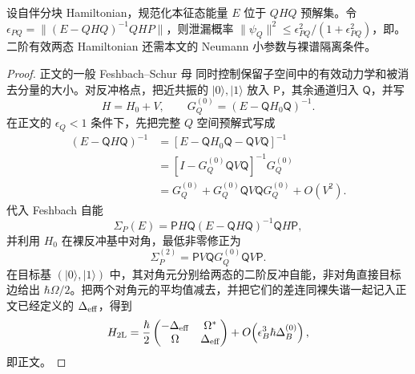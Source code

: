\begin{proposition}
设自伴分块 Hamiltonian，规范化本征态能量 $E$ 位于 $QHQ$ 预解集。令 $\epsilon_{PQ}=\|(E-QHQ)^{-1}QHP\|$，则泄漏概率 $\|\psi_Q\|^2\le\epsilon_{PQ}^2/(1+\epsilon_{PQ}^2)$，即。二阶有效两态 Hamiltonian 还需本文的 Neumann 小参数与裸谱隔离条件。
\end{proposition}
\begin{proof}
正文的一般 Feshbach--Schur 母 同时控制保留子空间中的有效动力学和被消去分量的大小。对反冲格点，把近共振的 $|0\rangle,|1\rangle$ 放入 $\mathsf P$，其余通道归入 $\mathsf Q$，并写
\begin{equation*}
 H=H_0+V,
 \qquad
 G_Q^{(0)}=(E-\mathsf QH_0\mathsf Q)^{-1}.
\end{equation*}
在正文的 $\epsilon_Q<1$ 条件下，先把完整 $Q$ 空间预解式写成
\begin{align*}
(E-\mathsf QH\mathsf Q)^{-1}
&=\left[E-\mathsf QH_0\mathsf Q-\mathsf QV\mathsf Q\right]^{-1}\\
&=\left[I-G_Q^{(0)}\mathsf QV\mathsf Q\right]^{-1}G_Q^{(0)}\\
&=G_Q^{(0)}+G_Q^{(0)}\mathsf QV\mathsf QG_Q^{(0)}+O(V^2).
\end{align*}
代入 Feshbach 自能
\begin{equation*}
 \Sigma_P(E)=\mathsf PH\mathsf Q(E-\mathsf QH\mathsf Q)^{-1}\mathsf QH\mathsf P,
\end{equation*}
并利用 $H_0$ 在裸反冲基中对角，最低非零修正为
\begin{equation*}
 \Sigma_P^{(2)}
 =\mathsf PV\mathsf QG_Q^{(0)}\mathsf QV\mathsf P.
\end{equation*}
在目标基 $(|0\rangle,|1\rangle)$ 中，其对角元分别给两态的二阶反冲自能，非对角直接目标边给出 $\hbar\Omega/2$。把两个对角元的平均值减去，并把它们的差连同裸失谐一起记入正文已经定义的 $\Delta_{\rm eff}$，得到
\begin{equation*}
 H_{2\rm L}
 =\frac{\hbar}{2}
 \begin{pmatrix}
 -\Delta_{\rm eff}&\Omega^*\\
 \Omega&\Delta_{\rm eff}
 \end{pmatrix}
 +O\!\left(\epsilon_B^3\hbar\Delta_B^{(0)}\right),
\end{equation*}
即正文。


\end{proof}
